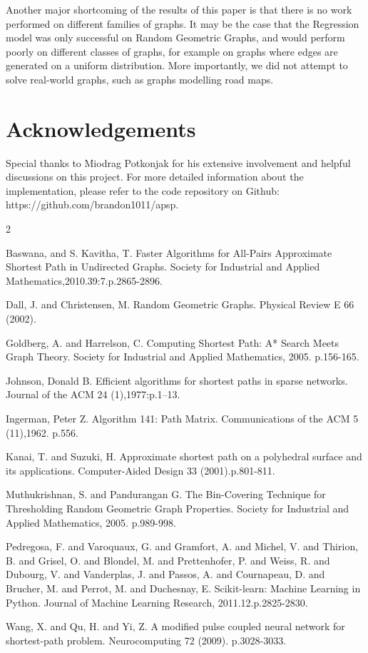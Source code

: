 \documentclass[10.5pt,journal]{IEEEtran}
\begin{document}
		Another major shortcoming of the results of this paper is that there is no work performed
		on different families of graphs. It may be the case that the Regression model was only
		successful on Random Geometric Graphs, and would perform poorly on different classes of graphs,
		for example
		on graphs where edges are generated on a uniform distribution. More importantly,
		we did not attempt to solve real-world graphs, such as graphs modelling road maps.
		
\section{Acknowledgements}
	Special thanks to Miodrag Potkonjak for his extensive involvement and helpful discussions
	on this project. For more detailed information about the implementation, please
	refer to the code repository on Github: https://github.com/brandon1011/apsp. 
	\begin{thebibliography} {2} \normalsize
	
		  Baswana, and S. Kavitha, T.
         Faster Algorithms for All-Pairs Approximate Shortest Path in Undirected Graphs.
         Society for Industrial and Applied Mathematics,2010.39:7.p.2865-2896.
         
		 Dall, J. and Christensen, M.
		Random Geometric Graphs.
		Physical Review E 66 (2002).
	
		 Goldberg, A. and Harrelson, C.
		Computing Shortest Path: A* Search Meets Graph Theory.
		Society for Industrial and Applied Mathematics, 2005.
		p.156-165.
		
		Johnson, Donald B.
		Efficient algorithms for shortest paths in sparse networks.
		Journal of the ACM 24 (1),1977:p.1–13.
		
		Ingerman, Peter Z.
		Algorithm 141: Path Matrix. 
		Communications of the ACM 5 (11),1962.
		p.556.

		 Kanai, T. and Suzuki, H.
		Approximate shortest path on a polyhedral surface and its applications.
		Computer-Aided Design 33 (2001).p.801-811.
		
		 Muthukrishnan, S. and Pandurangan G.
		The Bin-Covering Technique for Thresholding Random Geometric Graph Properties.
		Society for Industrial and Applied Mathematics, 2005.
		p.989-998.
		 
		 Pedregosa, F. and Varoquaux, G. and Gramfort, A. and Michel, V.
         and Thirion, B. and Grisel, O. and Blondel, M. and Prettenhofer, P.
         and Weiss, R. and Dubourg, V. and Vanderplas, J. and Passos, A. and
         Cournapeau, D. and Brucher, M. and Perrot, M. and Duchesnay, E.
         Scikit-learn: Machine Learning in Python.
         Journal of Machine Learning Research, 2011.12.p.2825-2830.
 
         
          Wang, X. and Qu, H. and Yi, Z.
         A modified pulse coupled neural network for shortest-path problem.
         Neurocomputing 72 (2009).
         p.3028-3033.
         

	\end{thebibliography}
\end{document}
